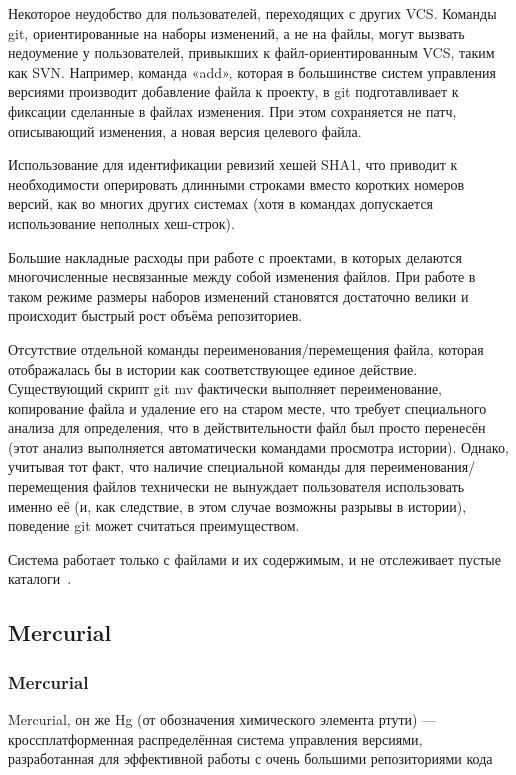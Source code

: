\documentclass{../industrial-development}
\begin{document}
Некоторое неудобство для пользователей, переходящих с других VCS. Команды git, ориентированные на наборы изменений, а не на файлы, могут вызвать недоумение у пользователей, привыкших к файл-ориентированным VCS, таким как SVN. Например, команда «add», которая в большинстве систем управления версиями производит добавление файла к проекту, в git подготавливает к фиксации сделанные в файлах изменения. При этом сохраняется не патч, описывающий изменения, а новая версия целевого файла.

Использование для идентификации ревизий хешей SHA1, что приводит к необходимости оперировать длинными строками вместо коротких номеров версий, как во многих других системах (хотя в командах допускается использование неполных хеш-строк).

Большие накладные расходы при работе с проектами, в которых делаются многочисленные несвязанные между собой изменения файлов. При работе в таком режиме размеры наборов изменений становятся достаточно велики и происходит быстрый рост объёма репозиториев.

Отсутствие отдельной команды переименования/перемещения файла, которая отображалась бы в истории как соответствующее единое действие. Существующий скрипт git mv фактически выполняет переименование, копирование файла и удаление его на старом месте, что требует специального анализа для определения, что в действительности файл был просто перенесён (этот анализ выполняется автоматически командами просмотра истории). Однако, учитывая тот факт, что наличие специальной команды для переименования/перемещения файлов технически не вынуждает пользователя использовать именно её (и, как следствие, в этом случае возможны разрывы в истории), поведение git может считаться преимуществом.

Система работает только с файлами и их содержимым, и не отслеживает пустые каталоги~\cite{GitWikipedia}.

\subsection{Mercurial}

\begin{frame} \frametitle{Mercurial}
  \begin{block}{}
    \alert{Mercurial, он же Hg (от обозначения химического элемента ртути)} --- кроссплатформенная распределённая система управления версиями, разработанная для эффективной работы с очень большими репозиториями кода
  \end{block}
\end{frame}
\end{document}
